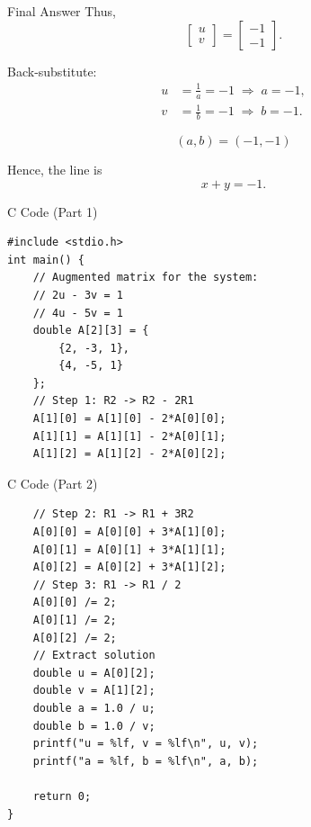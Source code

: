 \documentclass{beamer}
\begin{document}
\begin{frame}{Final Answer}
Thus,
\begin{equation}
\begin{bmatrix} u \\ v \end{bmatrix}
= \begin{bmatrix} -1 \\ -1 \end{bmatrix}.
\end{equation}

Back-substitute:
\begin{align}
u &= \frac{1}{a} = -1 \;\Rightarrow\; a=-1, \\
v &= \frac{1}{b} = -1 \;\Rightarrow\; b=-1.
\end{align}

\begin{equation}
\boxed{(a,b) = (-1,-1)}
\end{equation}

Hence, the line is
\begin{equation}
x+y = -1.
\end{equation}
\end{frame}
\begin{frame}[fragile]{C Code (Part 1)}
\begin{lstlisting}
#include <stdio.h>
int main() {
    // Augmented matrix for the system:
    // 2u - 3v = 1
    // 4u - 5v = 1
    double A[2][3] = {
        {2, -3, 1},
        {4, -5, 1}
    };
    // Step 1: R2 -> R2 - 2R1
    A[1][0] = A[1][0] - 2*A[0][0];
    A[1][1] = A[1][1] - 2*A[0][1];
    A[1][2] = A[1][2] - 2*A[0][2];
\end{lstlisting}
\end{frame}

\begin{frame}[fragile]{C Code (Part 2)}
\begin{lstlisting}
    // Step 2: R1 -> R1 + 3R2
    A[0][0] = A[0][0] + 3*A[1][0];
    A[0][1] = A[0][1] + 3*A[1][1];
    A[0][2] = A[0][2] + 3*A[1][2];
    // Step 3: R1 -> R1 / 2
    A[0][0] /= 2;
    A[0][1] /= 2;
    A[0][2] /= 2;
    // Extract solution
    double u = A[0][2];
    double v = A[1][2];
    double a = 1.0 / u;
    double b = 1.0 / v;
    printf("u = %lf, v = %lf\n", u, v);
    printf("a = %lf, b = %lf\n", a, b);
    
    return 0;
}
\end{lstlisting}
\end{frame}
\end{document}
